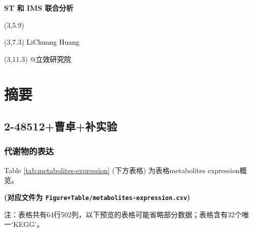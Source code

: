 \documentclass[
]{article}
\author{}
\date{\vspace{-2.5em}}
\begin{document}
\begin{titlepage} 
\begin{center} \textbf{\Huge ST 和 IMS 联合分析}
\vspace{4em} \begin{textblock}{10}(3,5.9) \huge
\textbf{\textcolor{white}{2023-11-29}}
\end{textblock} \begin{textblock}{10}(3,7.3)
\Large \textcolor{black}{LiChuang Huang}
\end{textblock} \begin{textblock}{10}(3,11.3)
\Large \textcolor{black}{@立效研究院}
\end{textblock} \end{center} \end{titlepage}
\restoregeometry


\tableofcontents

\listoffigures

\listoftables

\newpage


\hypertarget{abstract}{%
\section{摘要}\label{abstract}}

\hypertarget{ux66f9ux5353ux8865ux5b9eux9a8c}{%
\subsection{2-48512+曹卓+补实验}\label{ux66f9ux5353ux8865ux5b9eux9a8c}}

\hypertarget{ux4ee3ux8c22ux7269ux7684ux8868ux8fbe}{%
\subsubsection{代谢物的表达}\label{ux4ee3ux8c22ux7269ux7684ux8868ux8fbe}}

Table \ref{tab:metabolites-expression} (下方表格) 为表格metabolites expression概览。

\textbf{(对应文件为 \texttt{Figure+Table/metabolites-expression.csv})}

\begin{center}\begin{tcolorbox}[colback=gray!10, colframe=gray!50, width=0.9\linewidth, arc=1mm, boxrule=0.5pt]注：表格共有64行502列，以下预览的表格可能省略部分数据；表格含有32个唯一`KEGG'。
\end{tcolorbox}
\end{center}
\end{document}
